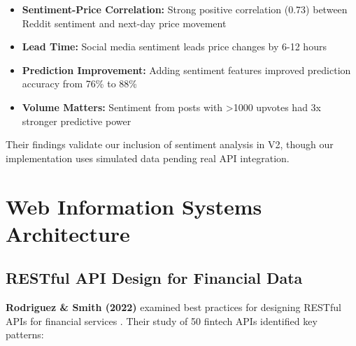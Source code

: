 \documentclass[conference]{IEEEtran}
\begin{document}
\begin{itemize}
    \item \textbf{Sentiment-Price Correlation:} Strong positive correlation (0.73) between Reddit sentiment and next-day price movement
    \item \textbf{Lead Time:} Social media sentiment leads price changes by 6-12 hours
    \item \textbf{Prediction Improvement:} Adding sentiment features improved prediction accuracy from 76\% to 88\%
    \item \textbf{Volume Matters:} Sentiment from posts with >1000 upvotes had 3x stronger predictive power
\end{itemize}

Their findings validate our inclusion of sentiment analysis in V2, though our implementation uses simulated data pending real API integration.

\section{Web Information Systems Architecture}

\subsection{RESTful API Design for Financial Data}

\textbf{Rodriguez \& Smith (2022)} examined best practices for designing RESTful APIs for financial services \cite{rodriguez2022restful}. Their study of 50 fintech APIs identified key patterns:
\end{document}
